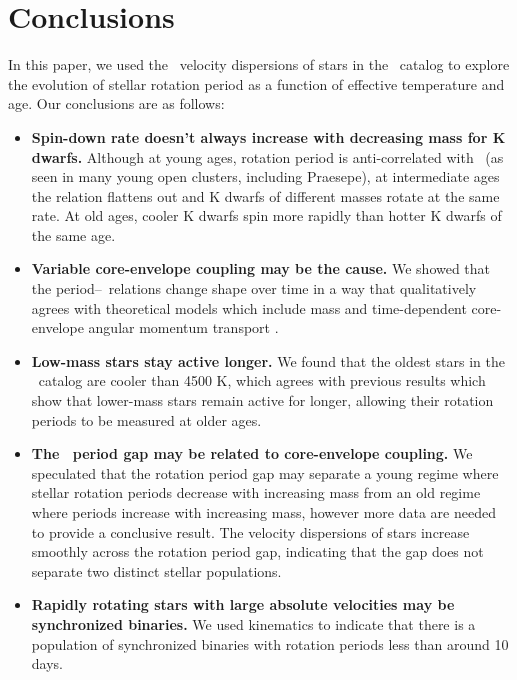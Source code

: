 \section{Conclusions}

In this paper, we used the \vb\ velocity dispersions of stars in the \mct\
catalog to explore the evolution of stellar rotation period as a function of
effective temperature and age.
Our conclusions are as follows:
\begin{itemize}
\item{{\bf Spin-down rate doesn't always increase with decreasing mass for K
    dwarfs.}
Although at young ages, rotation period is anti-correlated with \teff\ (as
seen in many young open clusters, including Praesepe), at intermediate ages the
relation flattens out and K dwarfs of different masses rotate at the same
rate.
At old ages, cooler K dwarfs spin more rapidly than hotter K dwarfs of the
same age.}

\item{{\bf Variable core-envelope coupling may be the cause.} We showed that
the period--\teff\ relations change shape over time in a way that
qualitatively agrees with theoretical models which include mass and
time-dependent core-envelope angular momentum transport \citep{spada2019}.}

\item{{\bf Low-mass stars stay active longer.}
We found that the oldest stars in the \mct\ catalog are cooler than 4500
K, which agrees with previous results which show that lower-mass stars remain
        active for longer, allowing their rotation periods to be measured at
        older ages.}

\item{{\bf The \kepler\ period gap may be related to core-envelope coupling.}
We speculated that the rotation period gap \citep{mcquillan2014} may separate
a young regime where stellar rotation periods decrease with increasing mass
from an old regime where periods increase with increasing mass, however more
data are needed to provide a conclusive result.
The velocity dispersions of stars increase smoothly across the rotation period
gap, indicating that the gap does not separate two distinct stellar
populations.}

\item{{\bf Rapidly rotating stars with large absolute velocities may be
synchronized binaries.}
We used kinematics to indicate that there is a population of
synchronized binaries with rotation periods less than around 10 days.}


\end{itemize}
